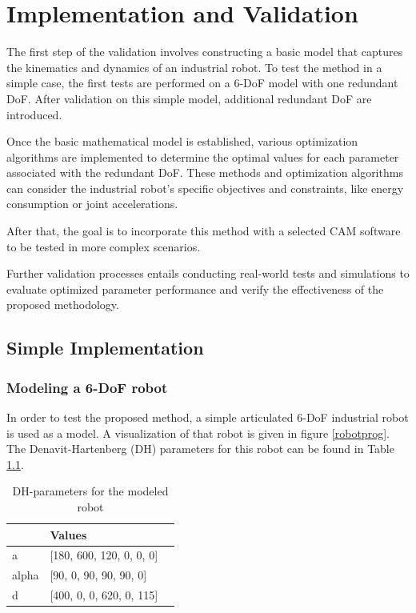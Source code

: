 \chapter{Implementation and Validation}%

The first step of the validation involves constructing a basic model that captures the kinematics and dynamics of an industrial robot. To test the method in a simple case, the first tests are performed on a 6-DoF model with one redundant DoF. After validation on this simple model, additional redundant DoF are introduced. 

Once the basic mathematical model is established, various optimization algorithms are implemented to determine the optimal values for each parameter associated with the redundant DoF. These methods and optimization algorithms can consider the industrial robot's specific objectives and constraints, like energy consumption or joint accelerations. 

After that, the goal is to incorporate this method with a selected CAM software to be tested in more complex scenarios.

Further validation processes entails conducting real-world tests and simulations to evaluate optimized parameter performance and verify the effectiveness of the proposed methodology.
\section{Simple Implementation}%
\subsection{Modeling a 6-DoF robot}
In order to test the proposed method, a simple articulated 6-DoF industrial robot is used as a model. A visualization of that robot is given in figure \ref{robotprog}. The Denavit-Hartenberg (DH) parameters for this robot can be found in Table \ref{DH}.


\begin{table}[H]
	\centering
	\begin{tabular}{||l|l|r||}
		  & Values \\
		\hline
		\hline
		\hline
		a	& [180, 600, 120, 0, 0, 0] \\
		alpha	&  [90, 0, 90, 90, 90, 0] \\
		d	& [400, 0, 0, 620, 0, 115]\\
		
		\hline
		\hline
	\end{tabular}
	
	\caption{DH-parameters for the modeled robot}
	\label{DH}
\end{table}

